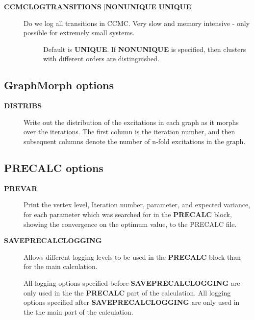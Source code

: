 \documentclass[openany,a4paper,10pt,english]{manual}
\begin{document}
\begin{description}
\item[\textbf{CCMCLOGTRANSITIONS} {[}\textbf{NONUNIQUE} \textbf{UNIQUE}{]}] \leavevmode\begin{description}
\item[Do we log all transitions in CCMC.  Very slow and memory intensive - only possible for extremely small systems.] \leavevmode
Default is \textbf{UNIQUE}.  If \textbf{NONUNIQUE} is specified, then clusters with different orders are distinguished.

\end{description}

\end{description}


\subsection{GraphMorph options}
\begin{description}
\item[\textbf{DISTRIBS}] \leavevmode
Write out the distribution of the excitations in each graph as it
morphs over the iterations. The first column is the iteration number, and
then subsequent columns denote the number of n-fold excitations in
the graph.

\end{description}


\subsection{PRECALC options}
\begin{description}
\item[\textbf{PREVAR}] \leavevmode
Print the vertex level, Iteration number, parameter, and expected
variance, for each parameter which was searched for in the \textbf{PRECALC}
block, showing the convergence on the optimum value, to the PRECALC
file.

\item[\textbf{SAVEPRECALCLOGGING}] \leavevmode
Allows different logging levels to be used in the \textbf{PRECALC} block
than for the main calculation.

All logging options specified before \textbf{SAVEPRECALCLOGGING} are only
used in the the \textbf{PRECALC} part of the calculation.  All logging
options specified after  \textbf{SAVEPRECALCLOGGING} are only used in the
the main part of the calculation.

\end{description}
\end{document}
